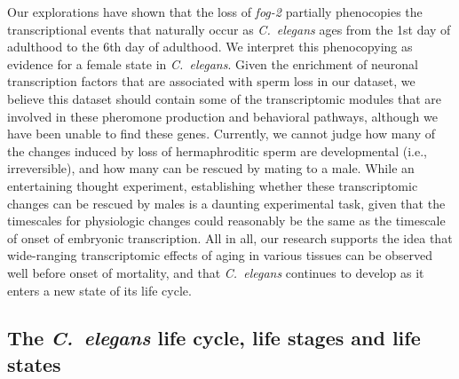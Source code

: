 \documentclass[10pt,letterpaper,twocolumn]{article}
\newcommand{\cel}{\emph{C.~elegans}}
\newcommand{\fog}{\emph{\mbox{fog-2}}}
\begin{document}
Our explorations have shown that the loss of \fog{} partially phenocopies the
transcriptional events that naturally occur as \cel{} ages from the 1st day of
adulthood to the 6th day of adulthood. We interpret this phenocopying as
evidence for a female state in \cel{}.
Given the enrichment of neuronal transcription factors that are associated with
sperm loss in our dataset, we believe this dataset should contain some of the
transcriptomic modules that are involved in these pheromone production and
behavioral pathways, although we have been unable to find these genes.
Currently, we cannot judge how many of the changes induced by loss of
hermaphroditic sperm are developmental (i.e., irreversible), and how many can be
rescued by mating to a male.
While an entertaining thought experiment, establishing whether these
transcriptomic changes can be rescued by males is a daunting experimental task,
given that the timescales for physiologic changes could reasonably be the same
as the timescale of onset of embryonic transcription. All in all, our research
supports the idea that wide-ranging transcriptomic effects of aging in various
tissues can be observed well before onset of mortality, and that \cel{}
continues to develop as it enters a new state of its life cycle.

\subsection*{The \cel{} life cycle, life stages and life states}
\end{document}
